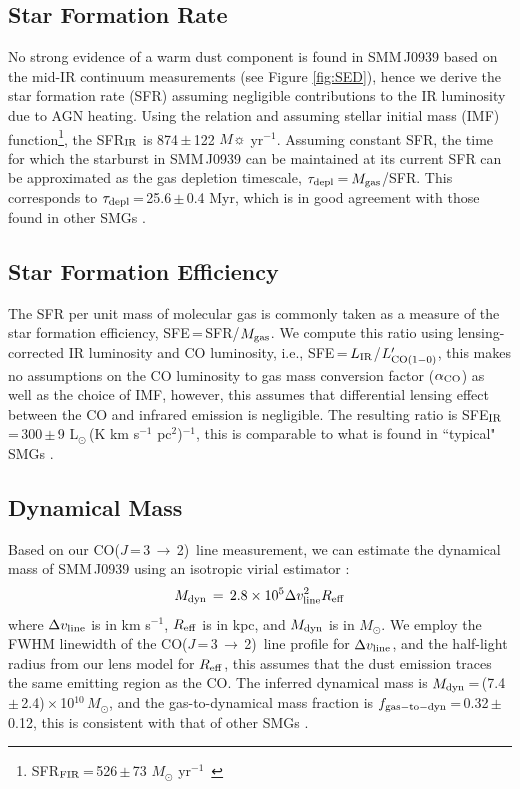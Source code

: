 \documentclass[twocolumn,apj,numberedappendix]{emulateapj}
\newcommand{\Msun}{\mbox{$M_{\odot}$}}
\newcommand{\Lsun}{\mbox{L$_{\odot}$}}
\newcommand{\CO}{\mbox{CO($J$\,=\,3\,$\rightarrow$\,2) }}
\newcommand{\Lp}{\mbox{$L^{\prime}_{\rm CO(1-0)}$}}
\newcommand{\LpU}{\mbox{K\,\,km\,\,s$^{-1}$\,\,pc$^2$}}
\newcommand{\eg}{{\sl e.g.,~}}
\newcommand{\pmOne}{\mbox{$^{-1}$}}
\begin{document}
\subsection{Star Formation Rate}
No strong evidence of a warm dust component is found in SMM\,J0939 based on the mid-IR continuum measurements (see Figure \ref{fig:SED}), hence we derive the star formation rate (SFR) assuming negligible contributions to the IR luminosity due to AGN heating. 
Using the \citet{Kennicutt98a} relation and assuming \citet{Chabrier03a}
stellar initial mass (IMF) function\footnote{SFR$_{\rm FIR}$\,=\,526\,$\pm$\,73 $M_
\odot$ yr\pmOne\ }, 
the SFR$_{\rm IR}$ is 874\,$\pm$\,122\,\,$M\sun$\,\,yr\pmOne.
Assuming constant SFR, the time for which the starburst in SMM\,J0939 can be maintained at its
current SFR can be approximated as the gas depletion timescale, $\tau_{\rm depl}$\,=\,$M_{\rm gas}$/SFR. 
This corresponds to $\tau_{\rm depl}$\,=\,25.6\,$\pm$\,0.4 Myr, which is in good agreement with those found in other SMGs \citep[\eg][]{Greve05a}. 

\subsection{Star Formation Efficiency}
The SFR per unit mass of molecular gas is commonly taken as a
measure of the star formation efficiency, SFE\,=\,SFR/$M_{\rm gas}$. We compute this ratio using lensing-corrected IR 
luminosity and CO luminosity, i.e., SFE\,=\,$L_{\rm IR}$/\Lp, this makes no assumptions on the CO luminosity to gas mass conversion factor ($\alpha_{\rm CO}$) as well as the 
choice of IMF, however, this assumes that differential lensing effect between the CO and infrared emission is negligible. 
The resulting ratio is SFE$_{\rm IR}$\,=\,300\,$\pm$\,9\,\,\Lsun\,(\LpU)$^{-1}$, this is comparable
to what is found in ``typical" SMGs \citep{Riechers11c,Greve05a,Tacconi06a}.

\subsection{Dynamical Mass} 
Based on our \CO line measurement, we can estimate the dynamical mass of SMM\,J0939 using an isotropic virial estimator \citep[\eg][]{Engel10a}:
\begin{equation}
M_{\rm dyn}\,=\,2.8\times 10^5\Delta v_{\rm line}^ 2 R_{\rm eff}
\end{equation}
where $\Delta v_{\rm line}$ is in km\,\,s\pmOne, $R_{\rm eff}$ is in kpc, and $M_{\rm dyn}$ is in \Msun.
We employ the FWHM linewidth of the \CO line profile for $\Delta v_{\rm line}$,
and the half-light radius from our lens model for $R_{\rm eff}$, this assumes that the dust emission traces the same emitting region as the CO. The inferred dynamical mass is $M_{\rm dyn}$\,=\,(7.4\,$\pm$\,2.4)\,$\times$\,10$^{10}$\,\Msun, and the gas-to-dynamical mass fraction is $f_{\rm gas-to-dyn}$\,=\,0.32\,$\pm$\,0.12, this is consistent with that of other SMGs \citep{Tacconi06a}.
\end{document}
